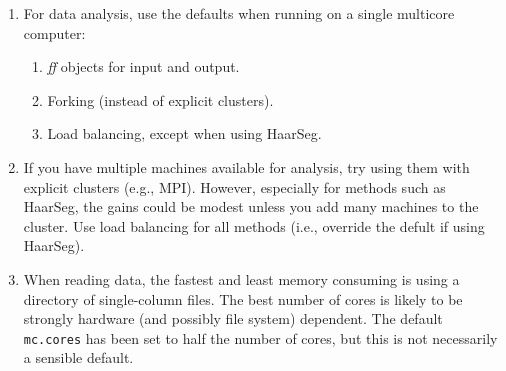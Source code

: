 \documentclass[a4paper,11pt]{article}
\begin{document}
\begin{enumerate}
\item For data analysis, use the defaults when running on a single
  multicore computer:
  \begin{enumerate}
  \item \textit{ff} objects for input and output.
  \item Forking (instead of explicit clusters).
  \item Load balancing, except when using HaarSeg.
  \end{enumerate}

\item If you have multiple machines available for analysis, try using them
  with explicit clusters (e.g., MPI). However, especially for methods such
  as HaarSeg, the gains could be modest unless you add many machines to
  the cluster. Use load balancing for all methods (i.e., override the
  defult if using HaarSeg).

\item When reading data, the fastest and least memory consuming is using a
  directory of single-column files. The best number of cores is likely to
  be strongly hardware (and possibly file system) dependent. The default
  \texttt{mc.cores} has been set to half the number of cores, but this is
  not necessarily a sensible default.
\end{enumerate}
\end{document}
